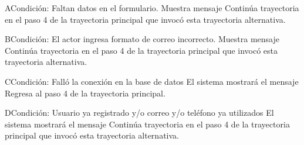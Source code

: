	\begin{UCtrayectoriaA}{A}{Condición: Faltan datos en el formulario.}
		\UCpaso[\UCsist] Muestra mensaje 
		\UCpaso[\UCsist] Continúa trayectoria en el paso  4 de la trayectoria  principal que invocó esta trayectoria alternativa. 
	\end{UCtrayectoriaA}
	\begin{UCtrayectoriaA}{B}{Condición: El actor ingresa formato de correo incorrecto.}
		\UCpaso[\UCsist] Muestra mensaje 
		\UCpaso[\UCsist] Continúa trayectoria en el paso 4 de la trayectoria  principal que invocó esta trayectoria alternativa.  
	\end{UCtrayectoriaA}
	\begin{UCtrayectoriaA}{C}{Condición: Falló la conexión en la base de datos}
		\UCpaso[\UCsist] El sistema mostrará el mensaje 
		\UCpaso[\UCsist] Regresa al paso 4 de la trayectoria principal. 
	\end{UCtrayectoriaA}	
		\begin{UCtrayectoriaA}{D}{Condición: Usuario ya registrado y/o correo y/o teléfono ya utilizados}
			\UCpaso[\UCsist] El sistema mostrará el mensaje 
			\UCpaso[\UCsist] Continúa trayectoria en el paso 4 de la trayectoria  principal que invocó esta trayectoria alternativa. 
	\end{UCtrayectoriaA}
